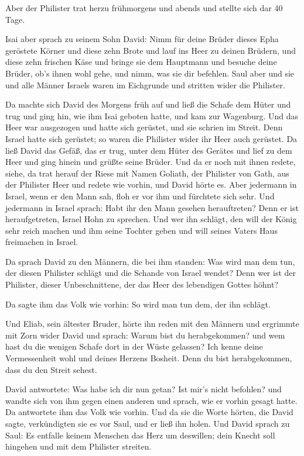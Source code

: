 Aber der Philister trat herzu frühmorgens und abends und
stellte sich dar 40 Tage.

 Isai aber sprach zu seinem Sohn David: Nimm für deine
Brüder dieses Epha geröstete Körner und diese zehn Brote und lauf ins
Heer zu deinen Brüdern,  und diese zehn frischen Käse und
bringe sie dem Hauptmann und besuche deine Brüder, ob's ihnen wohl gehe,
und nimm, was sie dir befehlen.  Saul aber und sie und alle
Männer Israels waren im Eichgrunde und stritten wider die Philister.

 Da machte sich David des Morgens früh auf und ließ die
Schafe dem Hüter und trug und ging hin, wie ihm Isai geboten hatte, und
kam zur Wagenburg. Und das Heer war ausgezogen und hatte sich gerüstet,
und sie schrien im Streit.  Denn Israel hatte sich
gerüstet; so waren die Philister wider ihr Heer auch gerüstet.
 Da ließ David das Gefäß, das er trug, unter dem Hüter des
Gerätes und lief zu dem Heer und ging hinein und grüßte seine Brüder.
 Und da er noch mit ihnen redete, siehe, da trat herauf der
Riese mit Namen Goliath, der Philister von Gath, aus der Philister Heer
und redete wie vorhin, und David hörte es.  Aber jedermann
in Israel, wenn er den Mann sah, floh er vor ihm und fürchtete sich
sehr.  Und jedermann in Israel sprach: Habt ihr den Mann
gesehen herauftreten? Denn er ist heraufgetreten, Israel Hohn zu
sprechen. Und wer ihn schlägt, den will der König sehr reich machen und
ihm seine Tochter geben und will seines Vaters Haus freimachen in
Israel.

 Da sprach David zu den Männern, die bei ihm standen: Was
wird man dem tun, der diesen Philister schlägt und die Schande von
Israel wendet? Denn wer ist der Philister, dieser Unbeschnittene, der
das Heer des lebendigen Gottes höhnt?

 Da sagte ihm das Volk wie vorhin: So wird man tun dem, der
ihn schlägt.

 Und Eliab, sein ältester Bruder, hörte ihn reden mit den
Männern und ergrimmte mit Zorn wider David und sprach: Warum bist du
herabgekommen? und wem hast du die wenigen Schafe dort in der Wüste
gelassen? Ich kenne deine Vermessenheit wohl und deines Herzens Bosheit.
Denn du bist herabgekommen, dass du den Streit sehest.

 David antwortete: Was habe ich dir nun getan? Ist mir's
nicht befohlen?  und wandte sich von ihm gegen einen
anderen und sprach, wie er vorhin gesagt hatte. Da antwortete ihm das
Volk wie vorhin.  Und da sie die Worte hörten, die David
sagte, verkündigten sie es vor Saul, und er ließ ihn holen.
 Und David sprach zu Saul: Es entfalle keinem Menschen das
Herz um deswillen; dein Knecht soll hingehen und mit dem Philister
streiten.


